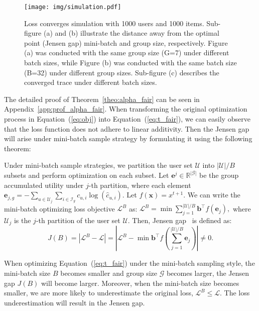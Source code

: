 \begin{figure}
    \centering
    \texttt{[image: img/simulation.pdf]}
    \caption{Loss converges simulation with 1000 users and 1000 items. Sub-figure (a) and (b) illustrate the distance away from the optimal point (\ie Jensen gap) \wrt mini-batch and group size, respectively. Figure (a) was conducted with the same group size (G=7) under different batch sizes, while Figure (b) was conducted with the same batch size (B=32) under different group sizes. Sub-figure (c) describes the converged trace under different batch sizes.}
    \label{fig:intro}
\end{figure}

The detailed proof of Theorem~\ref{theo:alpha_fair} can be seen in Appendix~\ref{app:prof_alpha_fair}. When transforming the original optimization process in Equation~(\ref{eq:obj}) into Equation~(\ref{eq:t_fair}),  we can easily observe that the loss function does not adhere to linear additivity. Then the
Jensen gap will arise under mini-batch sample strategy by formulating it using the following theorem:

\begin{theorem}\label{theo:error}
    Under mini-batch sample strategies, we partition the user set $\mathcal{U}$ into $|\mathcal{U}|/B$ subsets and perform optimization on each subset. Let $\bm{e}^j\in\mathbb{R}^{|\mathcal{G}|}$ be the group accumulated utility under $j$-th partition, where each element 
    $\bm{e}_{j,g} = -\sum_{u\in\mathcal{U}_j}\sum_{i\in\mathcal{I}_g}c_{u,i}\log (\hat{c}_{u,i})$.
    Let $f(\bm{x})=x^{t+1}$. We can write the mini-batch optimizing loss objective $\mathcal{L}^B$ as:
        $
            \mathcal{L}^B = \min \sum_{j=1}^{|\mathcal{U}|/B} \bm{b}^{\top}f(\bm{e}_j),
        $
        where $\mathcal{U}_j$ is the $j$-th partition of the user set $\mathcal{U}$. Then, Jensen gap~\citep{gao2017bounds, ullah2021determination} is defined as:
        \begin{equation}\label{eq:Jensen_gap}
            J(B) = |\mathcal{L}^B - \mathcal{L}|=|\mathcal{L}^B - \min \bm{b}^{\top}f(\sum_{j=1}^{|\mathcal{U}|/B} \bm{e}_j)| \neq 0.
        \end{equation}

   
   When optimizing Equation~(\ref{eq:t_fair}) under the mini-batch sampling style, the mini-batch size $B$ becomes smaller and group size $\mathcal{G}$ becomes larger, the  Jensen gap $J(B)$ will become larger. Moreover, when the mini-batch size becomes smaller, we are more likely to underestimate the original loss, \ie $\mathcal{L}^B \leq \mathcal{L}$. The loss underestimation will result in the Jensen gap.
   
\end{theorem}

